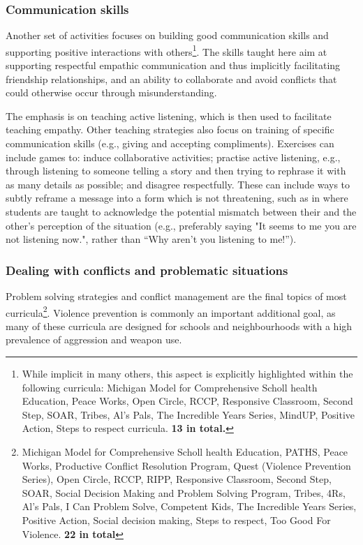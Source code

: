 \documentclass[prodmode,acmtochi]{acmsmall}
\begin{document}
\subsubsection{Communication skills}%
                Another set of activities focuses on building good communication skills and supporting positive interactions with others\footnote{While implicit in many others, this aspect is explicitly highlighted within the following curricula: Michigan Model for Comprehensive Scholl health Education, Peace  Works, Open Circle, RCCP, Responsive Classroom, Second Step, SOAR, Tribes, Al's Pals, The Incredible Years Series, MindUP, Positive Action, Steps to respect curricula. {\bf 13 in total.}}. The skills taught here aim at supporting respectful empathic communication and thus implicitly facilitating friendship relationships, and an ability to collaborate and avoid conflicts that could otherwise occur through misunderstanding. 

                 The emphasis is on teaching active listening, which is then used to facilitate teaching empathy. Other teaching strategies also focus on training of specific communication skills (e.g., giving and accepting compliments).
                Exercises can include games to: induce collaborative activities; practise active listening, e.g., through listening to someone telling a story and then trying to rephrase it with as many details as possible; and disagree respectfully. These can include ways to subtly reframe a message into a form which is not threatening, such as in  where students are taught to acknowledge the potential mismatch between their and the other's perception of the situation (e.g., preferably saying "It seems to me you are not listening now.", rather than ``Why aren't you listening to me!'').

        \subsubsection{Dealing with conflicts and problematic situations} 
                Problem solving strategies and conflict management are the final topics of most curricula\footnote{Michigan Model for Comprehensive Scholl health Education, PATHS, Peace Works, Productive Conflict Resolution Program, Quest (Violence Prevention Series), Open Circle, RCCP, RIPP, Responsive Classroom, Second Step, SOAR, Social Decision Making and Problem Solving Program, Tribes, 4Rs, Al's Pals, I Can Problem Solve, Competent Kids, The Incredible Years Series, Positive Action, Social decision making, Steps to respect, Too Good For Violence. {\bf 22 in total}}.  Violence prevention is commonly an important additional goal, as many of these curricula are designed  for schools and neighbourhoods with a high prevalence of aggression and weapon use. 
                
\end{document}
